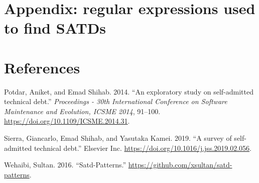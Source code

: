 \documentclass[
]{article}
\newlength{\cslhangindent}
\newenvironment{cslreferences}%
  {\setlength{\parindent}{0pt}%
  \everypar{\setlength{\hangindent}{\cslhangindent}}\ignorespaces}%
  {\par}
\begin{document}
%
%

\section*{Appendix: regular expressions used to find SATDs}
\label{sec_SATDs}

\small

\normalsize


%
%

\section*{References}

\hypertarget{refs}{}
\begin{cslreferences}
\leavevmode\hypertarget{ref-Potdar2014}{}%
Potdar, Aniket, and Emad Shihab. 2014. ``An exploratory study on
self-admitted technical debt.'' \emph{Proceedings - 30th International
Conference on Software Maintenance and Evolution, ICSME 2014}, 91--100.
\url{https://doi.org/10.1109/ICSME.2014.31}.

\leavevmode\hypertarget{ref-Sierra2019}{}%
Sierra, Giancarlo, Emad Shihab, and Yasutaka Kamei. 2019. ``A survey of
self-admitted technical debt.'' Elsevier Inc.
\url{https://doi.org/10.1016/j.jss.2019.02.056}.

\leavevmode\hypertarget{ref-Wehaibi2016}{}%
Wehaibi, Sultan. 2016. ``Satd-Patterns.''
\url{https://github.com/xsultan/satd-patterns}.
\end{cslreferences}
\end{document}
